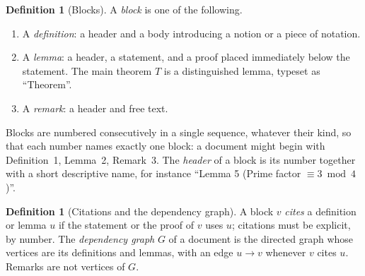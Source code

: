 \documentclass[11pt]{article}
\theoremstyle{plain}
\theoremstyle{definition}
\newtheorem{definition}[theorem]{Definition}
\theoremstyle{remark}
\theoremstyle{definition}
\theoremstyle{plain}
\theoremstyle{remark}
\begin{document}
\begin{definition}[Blocks]\label{def:block}
A \emph{block} is one of the following.
\begin{enumerate}[label=(\alph*)]
  \item A \emph{definition}: a header and a body introducing a notion or a piece of notation.
  \item A \emph{lemma}: a header, a statement, and a proof placed immediately below the statement. The main theorem $T$ is a distinguished lemma, typeset as ``Theorem''.
  \item A \emph{remark}: a header and free text.
\end{enumerate}
Blocks are numbered consecutively in a single sequence, whatever their kind, so that each number names exactly one block: a document might begin with Definition~1, Lemma~2, Remark~3. The \emph{header} of a block is its number together with a short descriptive name, for instance ``Lemma 5 (Prime factor $\equiv 3 \bmod 4$)''.
\end{definition}

\begin{definition}[Citations and the dependency graph]\label{def:graph}
A block $v$ \emph{cites} a definition or lemma $u$ if the statement or the proof of $v$ uses $u$; citations must be explicit, by number. The \emph{dependency graph} $G$ of a document is the directed graph whose vertices are its definitions and lemmas, with an edge $u \to v$ whenever $v$ cites $u$. Remarks are not vertices of $G$.
\end{definition}
\end{document}
